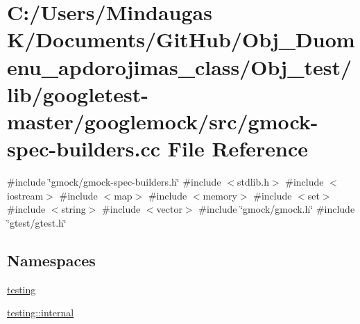 \hypertarget{_obj__test_2lib_2googletest-master_2googlemock_2src_2gmock-spec-builders_8cc}{}\section{C\+:/\+Users/\+Mindaugas K/\+Documents/\+Git\+Hub/\+Obj\+\_\+\+Duomenu\+\_\+apdorojimas\+\_\+class/\+Obj\+\_\+test/lib/googletest-\/master/googlemock/src/gmock-\/spec-\/builders.cc File Reference}
\label{_obj__test_2lib_2googletest-master_2googlemock_2src_2gmock-spec-builders_8cc}
{\ttfamily \#include \char`\"{}gmock/gmock-\/spec-\/builders.\+h\char`\"{}}\newline
{\ttfamily \#include $<$stdlib.\+h$>$}\newline
{\ttfamily \#include $<$iostream$>$}\newline
{\ttfamily \#include $<$map$>$}\newline
{\ttfamily \#include $<$memory$>$}\newline
{\ttfamily \#include $<$set$>$}\newline
{\ttfamily \#include $<$string$>$}\newline
{\ttfamily \#include $<$vector$>$}\newline
{\ttfamily \#include \char`\"{}gmock/gmock.\+h\char`\"{}}\newline
{\ttfamily \#include \char`\"{}gtest/gtest.\+h\char`\"{}}\newline
\subsection*{Namespaces}
\begin{DoxyCompactItemize}
\item 
 \mbox{\hyperlink{namespacetesting}{testing}}
\item 
 \mbox{\hyperlink{namespacetesting_1_1internal}{testing\+::internal}}
\end{DoxyCompactItemize}

